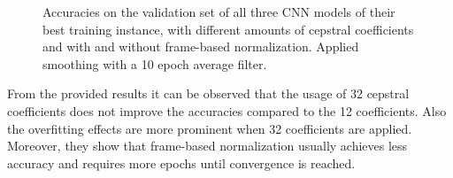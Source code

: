 \begin{figure}[!ht]
  \centering
  \caption{Accuracies on the validation set of all three CNN models of their best training instance, with different amounts of cepstral coefficients and with and without frame-based normalization. Applied smoothing with a 10 epoch average filter.}
  \label{fig:exp_fs_cepstral_acc}
\end{figure}
\FloatBarrier
\noindent
From the provided results it can be observed that the usage of 32 cepstral coefficients does not improve the accuracies compared to the 12 coefficients.
Also the overfitting effects are more prominent when 32 coefficients are applied.
Moreover, they show that frame-based normalization usually achieves less accuracy and requires more epochs until convergence is reached.

